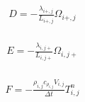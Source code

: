 \documentclass[a4paper,12pt,russian]{extreport}
\begin{document}
\begin{eqnarray}
\begin{gathered}
\label{eq:D_coeff}
D = - \frac{\lambda_{i+,j}}{L_{i+,j}} \Omega_{i+,j}
\end{gathered}
\end{eqnarray}

\begin{eqnarray}
\begin{gathered}
\label{eq:E_coeff}
E = - \frac{\lambda_{i,j+}}{L_{i,j+}} \Omega_{i,j+}
\end{gathered}
\end{eqnarray}

\begin{eqnarray}
\begin{gathered}
\label{eq:F_coeff}
F = - \frac{\rho_{i,j} c_{\rho_{i,j}} V_{i,j}}{\Delta t} T_{i,j}^n
\end{gathered}
\end{eqnarray}
\end{document}
